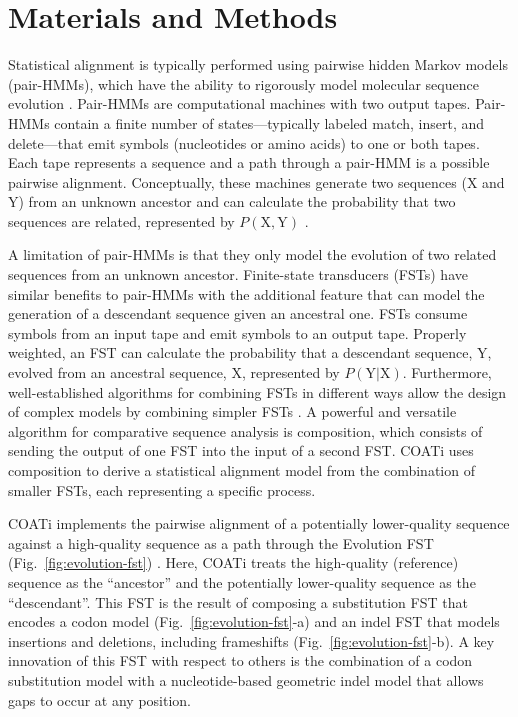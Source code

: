 \section*{Materials and Methods}

Statistical alignment is typically performed using pairwise hidden Markov models (pair-HMMs), which have the ability to rigorously model molecular sequence evolution .
Pair-HMMs are computational machines with two output tapes. Pair-HMMs contain a finite number of states---typically labeled match, insert, and delete---that emit symbols (nucleotides or amino acids) to one or both tapes.
Each tape represents a sequence and a path through a pair-HMM is a possible pairwise alignment.
Conceptually, these machines generate two sequences ($\text{X}$ and $\text{Y}$) from an unknown ancestor and can calculate the probability that two sequences are related, represented by $P(\text{X}, \text{Y})$ .

A limitation of pair-HMMs is that they only model the evolution of two related sequences from an unknown ancestor.
Finite-state transducers (FSTs) have similar benefits to pair-HMMs with the additional feature that can model the generation of a descendant sequence given an ancestral one.
FSTs consume symbols from an input tape and emit symbols to an output tape.
Properly weighted, an FST can calculate the probability that a descendant sequence, $\text{Y}$, evolved from an ancestral sequence, $\text{X}$, represented by $P(\text{Y} | \text{X})$.
Furthermore, well-established algorithms for combining FSTs in different ways allow the design of complex models by combining simpler FSTs .
A powerful and versatile algorithm for comparative sequence analysis is composition, which consists of sending the output of one FST into the input of a second FST.
COATi uses composition to derive a statistical alignment model from the combination of smaller FSTs, each representing a specific process.

COATi implements the pairwise alignment of a potentially lower-quality sequence against a high-quality sequence as a path through the Evolution FST (Fig.\ \ref{fig:evolution-fst}) \citep[c.f.][]{holmes2001evolutionary}.
Here, COATi treats the high-quality (reference) sequence as the ``ancestor'' and the potentially lower-quality sequence as the ``descendant''.
This FST is the result of composing a substitution FST that encodes a codon model (Fig.\ \ref{fig:evolution-fst}-a) and an indel FST that models insertions and deletions, including frameshifts (Fig.\ \ref{fig:evolution-fst}-b).
A key innovation of this FST with respect to others is the combination of a codon substitution model with a nucleotide-based geometric indel model that allows gaps to occur at any position.

